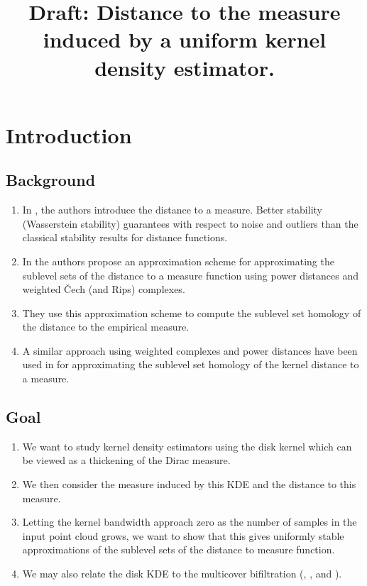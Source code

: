 \documentclass[10pt,a4paper]{article}
\title{Draft: Distance to the measure induced by a uniform kernel density estimator.}
\theoremstyle{definition}
\begin{document}
	\maketitle
	
	
	\section{Introduction}
	\subsection{Background}
	\begin{enumerate}
		\item In \autocite{chazal2011geometric}, the authors introduce the distance to a measure. Better stability (Wasserstein stability) guarantees with respect to noise and outliers than the classical stability results for distance functions.
		
		\item In \autocite{Buchet2013} the authors propose an approximation scheme for approximating the sublevel sets of the distance to a measure function using power distances and weighted Čech (and Rips) complexes.
		
		\item They use this approximation scheme to compute the sublevel set homology of the distance to the empirical measure.
		
		\item A similar approach using weighted complexes and power distances have been used in \autocite{Phillips2013} for approximating the sublevel set homology of the kernel distance to a measure.
	\end{enumerate}

	\subsection{Goal}
	\begin{enumerate}
		\item We want to study kernel density estimators using the disk kernel which can be viewed as a thickening of the Dirac measure.
		\item We then consider the measure induced by this KDE and the distance to this measure.
		\item Letting the kernel bandwidth approach zero as the number of samples in the input point cloud grows, we want to show that this gives uniformly stable approximations of the sublevel sets of the distance to measure function.
		\item We may also relate the disk KDE to the multicover bifiltration (\autocite{Blumberg2020}, \autocite{corbet2021}, \autocite{sheehy2012multicover} and \autocite{edelsbrunner2021multi}).
	\end{enumerate}
\end{document}
